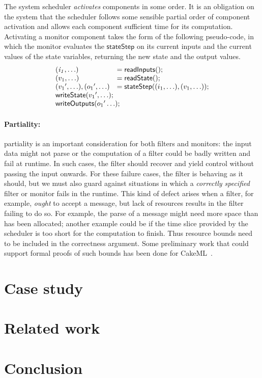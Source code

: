 \documentclass[global,twocolumn]{svjour}
\newcommand{\konst}[1]{\ensuremath{\mathsf{#1}}}
\newcommand{\ckml}{CakeML}
\begin{document}
The system scheduler \emph{activates} components in some order.
%
It is an obligation on the system that the scheduler follows some sensible partial order of component activation and allows each component sufficient time for its computation.
%
Activating a monitor component takes the form of the following pseudo-code, in which the monitor evaluates the \konst{stateStep} on its current inputs and the current values of the state variables, returning the new state and the output values.
%
\[
\begin{array}{ll}
 \mathit{(i_1,\ldots)} & = \konst{readInputs}(); \\
 (v_1,\ldots) & = \konst{readState}() ; \\
 ({v_1}',\ldots), ({o_1}',\ldots) & = \konst{stateStep} ((i_1,\ldots),(v_1,\ldots)) ; \\
 \multicolumn{2}{l}{\konst{writeState}({v_1}',\ldots);} \\
 \multicolumn{2}{l}{\konst{writeOutputs}({o_1}'\ldots);} \\
\end{array}
\]


\paragraph{Partiality:\/} partiality is an important consideration for both filters and monitors: the input data might not parse or the computation of a filter could be badly written and fail at runtime.
%
In such cases, the filter should recover and yield control without passing the input onwards.
%
For these failure cases, the filter is behaving as it should, but we must also guard against situations in which a \emph{correctly specified} filter or monitor fails in the runtime.
%
This kind of defect arises when a filter, for example, \emph{ought} to accept a message, but lack of resources results in the filter failing to do so.
%
For example, the parse of a message might need more space than has been allocated;
%
another example could be if the time slice provided by the scheduler is too short for the computation to finish.
%
Thus resource bounds need to be included in the correctness argument.
%
Some preliminary work that could support formal proofs of such bounds has been done for \ckml\ \cite{cakeml-space-cost}.

\section{Case study}
\label{sec:case-study}


\section{Related work}
\label{sec:related-work}


\section{Conclusion}
\label{sec:conclusion}


\clearpage


\end{document}
